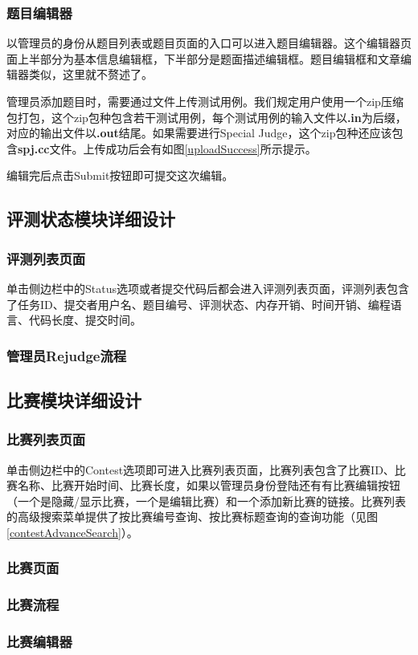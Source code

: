 
\subsubsection{题目编辑器}
以管理员的身份从题目列表或题目页面的入口可以进入题目编辑器。这个编辑器页面上半部分为基本信息编辑框，下半部分是题面描述编辑框。题目编辑框和文章编辑器类似，这里就不赘述了。


管理员添加题目时，需要通过文件上传测试用例。我们规定用户使用一个zip压缩包打包，这个zip包种包含若干测试用例，每个测试用例的输入文件以\textbf{.in}为后缀，对应的输出文件以\textbf{.out}结尾。如果需要进行Special Judge，这个zip包种还应该包含\textbf{spj.cc}文件。上传成功后会有如图\ref{uploadSuccess}所示提示。


编辑完后点击Submit按钮即可提交这次编辑。

\subsection{评测状态模块详细设计}
\subsubsection{评测列表页面}
单击侧边栏中的Status选项或者提交代码后都会进入评测列表页面，评测列表包含了任务ID、提交者用户名、题目编号、评测状态、内存开销、时间开销、编程语言、代码长度、提交时间。

\subsubsection{管理员Rejudge流程}

\subsection{比赛模块详细设计}
\subsubsection{比赛列表页面}

单击侧边栏中的Contest选项即可进入比赛列表页面，比赛列表包含了比赛ID、比赛名称、比赛开始时间、比赛长度，如果以管理员身份登陆还有有比赛编辑按钮（一个是隐藏/显示比赛，一个是编辑比赛）和一个添加新比赛的链接。比赛列表的高级搜索菜单提供了按比赛编号查询、按比赛标题查询的查询功能（见图\ref{contestAdvanceSearch}）。

\subsubsection{比赛页面}
\subsubsection{比赛流程}
\subsubsection{比赛编辑器}
